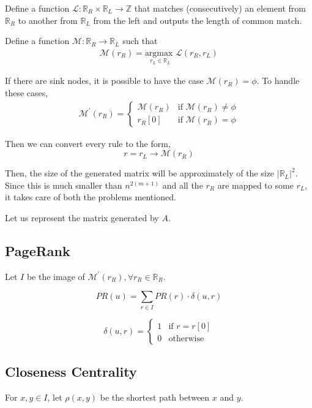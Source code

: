 \documentclass[]{article}
\begin{document}
Define a function $\mathcal{L}: \mathbb{R}_R \times \mathbb{R}_L \rightarrow \mathbb{Z}$ that matches (consecutively) an element from $\mathbb{R}_R$ to another from $\mathbb{R}_L$ from the left and outputs the length of common match.

Define a function $\mathcal{M}:\mathbb{R}_R \rightarrow \mathbb{R}_L$ such that
\begin{align*}
\mathcal{M}\left(r_R\right) = \underset{r_L \in \mathbb{R}_L}{\text{argmax }} \mathcal{L}\left(r_R, r_L\right)
\end{align*}

If there are sink nodes, it is possible to have the case $\mathcal{M}\left(r_R\right) = \phi$. To handle these cases,
\begin{align*}
	\mathcal{M}^\prime\left(r_R\right) = \begin{cases}
	\mathcal{M}\left(r_R\right) & \text{if } \mathcal{M}\left(r_R\right) \ne \phi \\
	r_R[0] & \text{if } \mathcal{M}\left(r_R\right) = \phi
	\end{cases}
\end{align*}

Then we can convert every rule to the form,
\[
r = r_L \rightarrow \mathcal{M}\left(r_R\right)
\]

Then, the size of the generated matrix will be approximately of the size $\vert \mathbb{R}_L \vert ^ 2$.
Since this is much smaller than $n^{2(m+1)}$ and all the $r_R$ are mapped to some $r_L$, it takes care of both the problems mentioned.

Let us represent the matrix generated by $A$.

\subsection{PageRank}

Let $I$ be the image of $\mathcal{M}^\prime\left(r_R\right), \forall r_R \in \mathbb{R}_R$.

\[
PR\left(u\right) = \sum_{r \in I} PR\left(r\right) \cdot \delta\left(u,r\right)
\]

\[
\delta\left(u,r\right) = \begin{cases}
1 & \text{if } r = r[0]\\
0 & \text{otherwise}
\end{cases}
\]

\subsection{Closeness Centrality}
For $x,y \in I$, let $\rho(x,y)$ be the shortest path between $x$ and $y$.
\end{document}
